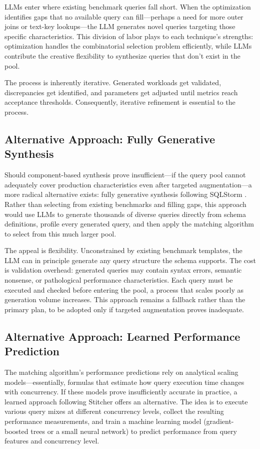 \documentclass[12pt]{report}
\begin{document}
LLMs enter where existing benchmark queries fall short. When the optimization identifies gaps that no available query can fill---perhaps a need for more outer joins or text-key lookups---the LLM generates novel queries targeting those specific characteristics. This division of labor plays to each technique's strengths: optimization handles the combinatorial selection problem efficiently, while LLMs contribute the creative flexibility to synthesize queries that don't exist in the pool.

The process is inherently iterative. Generated workloads get validated, discrepancies get identified, and parameters get adjusted until metrics reach acceptance thresholds. Consequently, iterative refinement is essential to the process.

\subsection{Alternative Approach: Fully Generative Synthesis}
\label{subsec:alternative-generative}

Should component-based synthesis prove insufficient---if the query pool cannot adequately cover production characteristics even after targeted augmentation---a more radical alternative exists: fully generative synthesis following SQLStorm \cite{sqlstorm}. Rather than selecting from existing benchmarks and filling gaps, this approach would use LLMs to generate thousands of diverse queries directly from schema definitions, profile every generated query, and then apply the matching algorithm to select from this much larger pool.

The appeal is flexibility. Unconstrained by existing benchmark templates, the LLM can in principle generate any query structure the schema supports. The cost is validation overhead: generated queries may contain syntax errors, semantic nonsense, or pathological performance characteristics. Each query must be executed and checked before entering the pool, a process that scales poorly as generation volume increases. This approach remains a fallback rather than the primary plan, to be adopted only if targeted augmentation proves inadequate.

\subsection{Alternative Approach: Learned Performance Prediction}
\label{subsec:alternative-learned}

The matching algorithm's performance predictions rely on analytical scaling models---essentially, formulas that estimate how query execution time changes with concurrency. If these models prove insufficiently accurate in practice, a learned approach following Stitcher \cite{stitcher} offers an alternative. The idea is to execute various query mixes at different concurrency levels, collect the resulting performance measurements, and train a machine learning model (gradient-boosted trees or a small neural network) to predict performance from query features and concurrency level.
\end{document}
